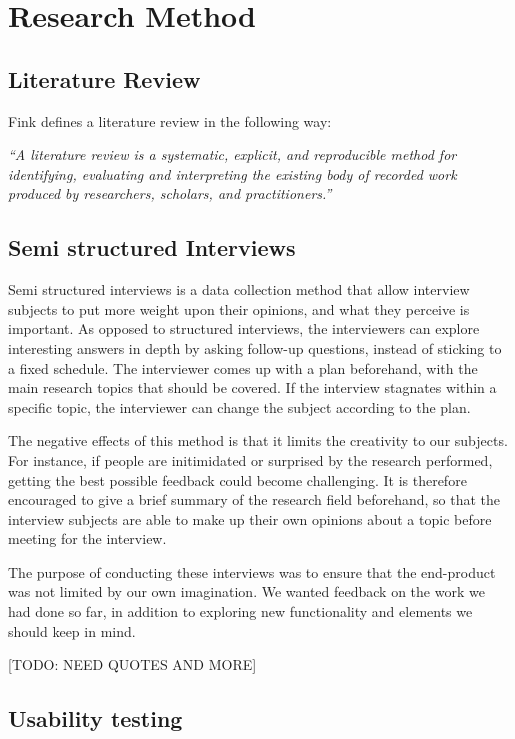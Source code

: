 \chapter{Research Method}
\label{sec:researchmethod}

\section{Literature Review}
\label{sec:literaturestudy}
Fink\cite{fink2013conducting} defines a literature review in the following way:

\textit{``A literature review is a systematic, explicit, and reproducible method for identifying, evaluating and interpreting the existing body of recorded work produced by researchers, scholars, and practitioners.''}\cite{fink2013conducting}


\section{Semi structured Interviews}
\label{sec:semistructuredinterviews}
Semi structured interviews is a data collection method that allow interview subjects to put more weight upon their opinions, and what they perceive is important. As opposed to structured interviews, the interviewers can explore interesting answers in depth by asking follow-up questions, instead of sticking to a fixed schedule. The interviewer comes up with a plan beforehand, with the main research topics that should be covered. If the interview stagnates within a specific topic, the interviewer can change the subject according to the plan.

The negative effects of this method is that it limits the creativity to our subjects. For instance, if people are initimidated or surprised by the research performed, getting the best possible feedback could become challenging. It is therefore encouraged to give a brief summary of the research field beforehand, so that the interview subjects are able to make up their own opinions about a topic before meeting for the interview.   

The purpose of conducting these interviews was to ensure that the end-product was not limited by our own imagination. We wanted feedback on the work we had done so far, in addition to exploring new functionality and elements we should keep in mind.

[TODO: NEED QUOTES AND MORE]

\section{Usability testing}
\label{sec:usabilitytesting}


